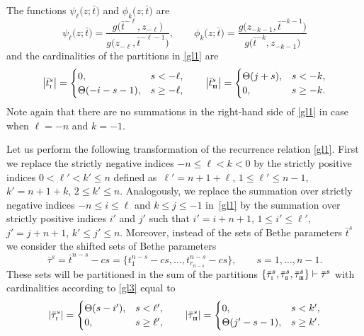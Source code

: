 \documentclass[pdftex]{sigma}
\newcommand{\so}{\scriptscriptstyle \rm I}
\newcommand{\st}{\scriptscriptstyle \rm I\hspace{-1pt}I}
\newcommand{\sth}{\scriptscriptstyle \rm I\hspace{-1pt}I\hspace{-1pt}I}
\newcommand{\bt}{{\bar t}}
\newcommand{\btt}{{\bar\tau}}
\theoremstyle{definition}
\def\r#1{\eqref{#1}}
\def\lp{{\ell'}}
\def\kp{{k'}}
\def\ip{{i'}}
\def\jp{{j'}}
\begin{document}
The functions
$\psi_\ell\bigl(z;\bt\bigr)$ and $\phi_k\bigl(z;\bt\bigr)$ are
\[%
\psi_\ell\bigl(z;\bt\bigr)=\frac{g\bigl(\bt^{-\ell},z_{-\ell}\bigr)}{g\bigl(z_{-\ell},\bt^{-\ell-1}\bigr)},\qquad
\phi_k\bigl(z;\bt\bigr)=\frac{g\bigl(z_{-k-1},\bt^{-k-1}\bigr)}{g\bigl(\bt^{-k},z_{-k-1}\bigr)}
\]
and the cardinalities of the partitions in \r{gl1} are
\begin{equation}\label{gl3}
\big|\bt^s_{\so}\big|=\begin{cases}
0, &s<-\ell,\\
\Theta(-i-s-1), &s\geq -\ell,
\end{cases}\qquad
\big|\bt^s_{\sth}\big|=\begin{cases}
\Theta(j+s), &s<-k,\\
0, &s\geq -k.
\end{cases}
\end{equation}
Note again that there are no summations in the right-hand side of \r{gl1}
in case when $\ell=-n$ and $k=-1$.


Let us perform the following transformation of the recurrence relation
\r{gl1}. First we replace the strictly negative indices $-n\leq \ell<k<0$
by the strictly positive indices $0<\lp<\kp\leq n$ defined as~${
\lp=n+1+\ell}$, $ 1\leq\lp\leq n-1$, $ \kp=n+1+k$, $ 2\leq\kp\leq n$.
Analogously, we replace the summation over strictly negative
indices $-n\leq i\leq \ell$ and $k\leq j\leq -1$ in~\r{gl1} by the summation
over strictly positive indices $\ip$ and $\jp$ such that
$
\ip=i+n+1$, $ 1\leq \ip\leq \lp$, $ \jp=j+n+1$, $ \kp\leq\jp\leq n $.
Moreover, instead of the sets of Bethe parameters $\bt^s$ we consider
the shifted sets of Bethe parameters
\begin{equation}\label{gl10}
\btt^s=\bt^{ n-s}-c s=
\bigl\{t^{ n-s}_1-c s,\dots,t^{ n-s}_{r_{n-s}}-c s\bigr\},\qquad s=1,\dots,n-1 .
\end{equation}
These sets will be partitioned in the sum of the partitions
$\{\btt^s_{\so},\btt^s_{\st},\btt^s_{\sth}\}\vdash \btt^s$ with cardinalities
according to \r{gl3} equal to
\[%
|\btt^s_{\so}|=\begin{cases}
\Theta(s-\ip), &s<\lp,\\
0, &s\geq \lp,
\end{cases}\qquad
|\btt^s_{\sth}|=\begin{cases}
0, &s<\kp,\\
\Theta(\jp-s-1), &s\geq \kp.
\end{cases}
\]
\end{document}
